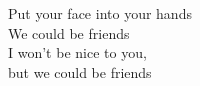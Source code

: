 Put your face into your hands\\
We could be friends\\
I won't be nice to you,\\
but we could be friends\\


